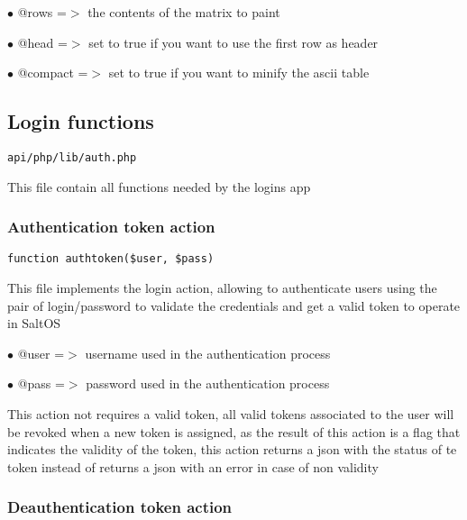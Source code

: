 \documentclass[a4paper]{article}
\begin{document}
\begin{compactitem}
\item[\color{myblue}$\bullet$] @rows    =$>$ the contents of the matrix to paint
\item[\color{myblue}$\bullet$] @head    =$>$ set to true if you want to use the first row as header
\item[\color{myblue}$\bullet$] @compact =$>$ set to true if you want to minify the ascii table
\end{compactitem}

\hypertarget{toc375}{}
\subsection{Login functions}

\begin{lstlisting}
api/php/lib/auth.php
\end{lstlisting}

This file contain all functions needed by the logins app

\hypertarget{toc376}{}
\subsubsection{Authentication token action}

\begin{lstlisting}
function authtoken($user, $pass)
\end{lstlisting}

This file implements the login action, allowing to authenticate users using the pair
of login/password to validate the credentials and get a valid token to operate in SaltOS

\begin{compactitem}
\item[\color{myblue}$\bullet$] @user =$>$ username used in the authentication process
\item[\color{myblue}$\bullet$] @pass =$>$ password used in the authentication process
\end{compactitem}

This action not requires a valid token, all valid tokens associated
to the user will be revoked when a new token is assigned, as the result of this action
is a flag that indicates the validity of the token, this action returns a json with the
status of te token instead of returns a json with an error in case of non validity

\hypertarget{toc377}{}
\subsubsection{Deauthentication token action}
\end{document}
